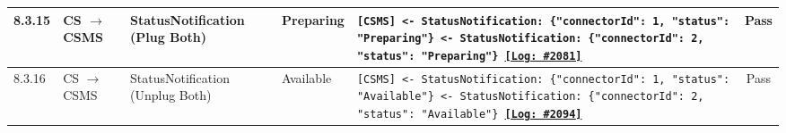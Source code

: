 \documentclass[10pt, a4paper, landscape]{article}
\begin{document}
\begin{longtable}{|p{1.0cm}|p{2.5cm}|p{4.0cm}|p{5.0cm}|p{10.0cm}|c|}
\hline
8.3.15 & CS $\to$ CSMS & StatusNotification (Plug Both) & Preparing & \footnotesize\texttt{[CSMS] <- StatusNotification: \{"connectorId": 1, "status": "Preparing"\} \newline [CSMS] <- StatusNotification: \{"connectorId": 2, "status": "Preparing"\} \newline \hyperref[log:8.3.15]{\textbf{[Log: \#2081]}}} & Pass \\
\hline
8.3.16 & CS $\to$ CSMS & StatusNotification (Unplug Both) & Available & \footnotesize\texttt{[CSMS] <- StatusNotification: \{"connectorId": 1, "status": "Available"\} \newline [CSMS] <- StatusNotification: \{"connectorId": 2, "status": "Available"\} \newline \hyperref[log:8.3.16]{\textbf{[Log: \#2094]}}} & Pass \\
\hline


\end{longtable}
\end{document}
